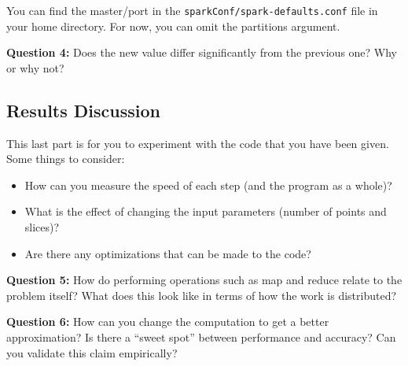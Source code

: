 \documentclass[11pt,letterpaper]{article}
\begin{document}
You can find the master/port in the \texttt{sparkConf/spark-defaults.conf} file in your home directory. For now, you can omit the partitions argument.

\noindent
\textbf{Question 4:} Does the new value differ significantly from the previous one? Why or why not?
\vspace{1in}

\subsection{Results Discussion}

This last part is for you to experiment with the code that you have been given. Some things to consider:

\begin{itemize}
    \item How can you measure the speed of each step (and the program as a whole)?
    \item What is the effect of changing the input parameters (number of points and slices)?
    \item Are there any optimizations that can be made to the code?
\end{itemize}
\newpage
\noindent
\textbf{Question 5:} How do performing operations such as map and reduce relate to the problem itself? What does this look like in terms of how the work is distributed?
\vspace{2in}

\noindent
\textbf{Question 6:} How can you change the computation to get a better approximation? Is there a ``sweet spot'' between performance and accuracy? Can you validate this claim empirically?
\end{document}

